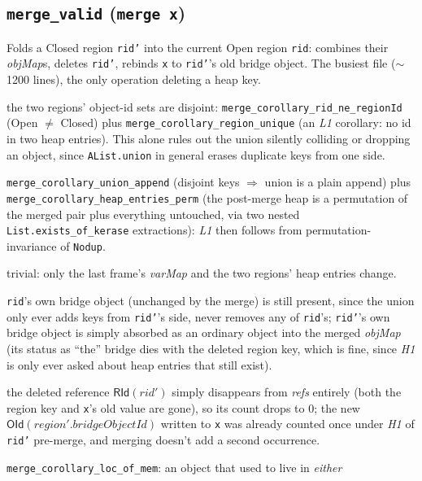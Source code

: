 \documentclass[11pt]{article}
\newcommand{\op}[1]{\texttt{#1}}
\newcommand{\thm}[1]{\textbf{\texttt{#1}}}
\begin{document}
\subsection{\thm{merge\_valid} (\op{merge x})}
Folds a Closed region \op{rid'} into the current Open region \op{rid}: combines their
\textit{objMap}s, deletes \op{rid'}, rebinds \texttt{x} to \op{rid'}'s old bridge object. The
busiest file ($\sim$1200 lines), the only operation deleting a heap key.
\begin{description}[nosep]
  \item[The load-bearing fact] the two regions' object-id sets are disjoint:
    \texttt{merge\_corollary\_rid\_ne\_regionId} (Open $\ne$ Closed) plus
    \texttt{merge\_corollary\_region\_unique} (an \textit{L1} corollary: no id in two heap
    entries). This alone rules out the union silently colliding or dropping an object, since
    \texttt{AList.union} in general erases duplicate keys from one side.
  \item[L1] \texttt{merge\_corollary\_union\_append} (disjoint keys $\Rightarrow$ union is a plain
    append) plus \texttt{merge\_corollary\_heap\_entries\_perm} (the post-merge heap is a
    permutation of the merged pair plus everything untouched, via two nested
    \texttt{List.exists\_of\_kerase} extractions): \textit{L1} then follows from
    permutation-invariance of \texttt{Nodup}.
  \item[L2, S1] trivial: only the last frame's \textit{varMap} and the two regions' heap entries
    change.
  \item[H1] \op{rid}'s own bridge object (unchanged by the merge) is still present, since the
    union only ever adds keys from \op{rid'}'s side, never removes any of \op{rid}'s; \op{rid'}'s
    own bridge object is simply absorbed as an ordinary object into the merged \textit{objMap}
    (its status as ``the'' bridge dies with the deleted region key, which is fine, since \textit{H1}
    is only ever asked about heap entries that still exist).
  \item[H2] the deleted reference $\mathsf{RId}(rid')$ simply disappears from \textit{refs}
    entirely (both the region key and \texttt{x}'s old value are gone), so its count drops to $0$;
    the new $\mathsf{OId}(region'.bridgeObjectId)$ written to \texttt{x} was already counted once
    under \textit{H1} of \op{rid'} pre-merge, and merging doesn't add a second occurrence.
  \item[H3] \texttt{merge\_corollary\_loc\_of\_mem}: an object that used to live in \emph{either}

\end{description}
\end{document}
